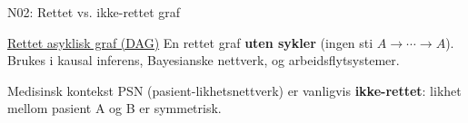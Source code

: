 \documentclass[aspectratio=169, 10pt]{beamer}
\begin{document}
\begin{frame}{N02: Rettet vs. ikke-rettet graf}
    \vspace{2mm}
    
    \begin{block}{\footnotesize \href{https://en.wikipedia.org/wiki/Directed_acyclic_graph}{Rettet asyklisk graf (DAG)}}
        \footnotesize En rettet graf \textbf{uten sykler} (ingen sti $A \rightarrow \cdots \rightarrow A$). Brukes i kausal inferens, Bayesianske nettverk, og arbeidsflytsystemer.
    \end{block}
    
    \vspace{1mm}
    
    \begin{block}{\footnotesize Medisinsk kontekst}
        \footnotesize PSN (pasient-likhetsnettverk) er vanligvis \textbf{ikke-rettet}: likhet mellom pasient A og B er symmetrisk.
    \end{block}
    
\end{frame}
\end{document}
